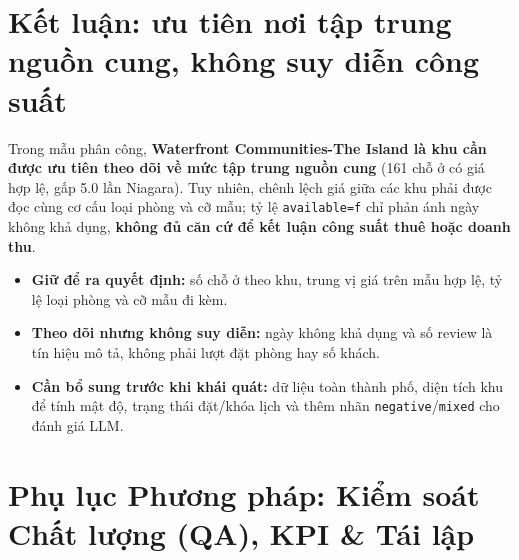 \documentclass[11pt,a4paper]{article}
\begin{document}
\section{Kết luận: ưu tiên nơi tập trung nguồn cung, không suy diễn công suất}

\begin{storybox}
Trong mẫu phân công, \textbf{Waterfront Communities-The Island là khu cần được ưu tiên theo dõi về mức tập trung nguồn cung} (161 chỗ ở có giá hợp lệ, gấp 5.0 lần Niagara). Tuy nhiên, chênh lệch giá giữa các khu phải được đọc cùng cơ cấu loại phòng và cỡ mẫu; tỷ lệ \texttt{available=f} chỉ phản ánh ngày không khả dụng, \textbf{không đủ căn cứ để kết luận công suất thuê hoặc doanh thu}.
\end{storybox}

\begin{itemize}
  \item \textbf{Giữ để ra quyết định:} số chỗ ở theo khu, trung vị giá trên mẫu hợp lệ, tỷ lệ loại phòng và cỡ mẫu đi kèm.
  \item \textbf{Theo dõi nhưng không suy diễn:} ngày không khả dụng và số review là tín hiệu mô tả, không phải lượt đặt phòng hay số khách.
  \item \textbf{Cần bổ sung trước khi khái quát:} dữ liệu toàn thành phố, diện tích khu để tính mật độ, trạng thái đặt/khóa lịch và thêm nhãn \texttt{negative}/\texttt{mixed} cho đánh giá LLM.
\end{itemize}

\section{Phụ lục Phương pháp: Kiểm soát Chất lượng (QA), KPI \& Tái lập}
\end{document}
